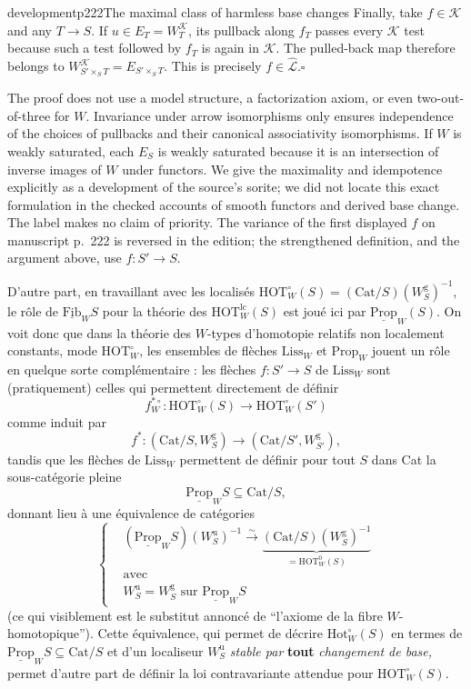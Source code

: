 \begin{dcomment}{development}{p222}{The maximal class of harmless base changes}
Finally, take $f\in\mathcal K$ and any $T\to S$. If $u\in E_T=W^{\mathcal K}_T$, its pullback along $f_T$ passes every $\mathcal K$ test because such a test followed by $f_T$ is again in $\mathcal K$. The pulled-back map therefore belongs to $W^{\mathcal K}_{S'\times_ST}=E_{S'\times_ST}$. This is precisely $f\in\widehat{\mathcal L}$.\hfill$\square$

The proof does not use a model structure, a factorization axiom, or even two-out-of-three for $W$. Invariance under arrow isomorphisms only ensures independence of the choices of pullbacks and their canonical associativity isomorphisms. If $W$ is weakly saturated, each $E_S$ is weakly saturated because it is an intersection of inverse images of $W$ under functors. We give the maximality and idempotence explicitly as a development of the source's sorite; we did not locate this exact formulation in the checked accounts of smooth functors and derived base change. The label makes no claim of priority. The variance of the first displayed $f$ on manuscript p.~222 is reversed in the edition; the strengthened definition, and the argument above, use $f:S'\to S$.
\end{dcomment}


D'autre part, en travaillant avec les localisés $\mathrm{HOT}^\circ_W(S) = (\mathrm{Cat}/S)(W^{\mathrm{g}}_S)^{-1}$, le rôle de $\underline{\mathrm{Fib}}_W S$ pour la théorie des $\mathrm{HOT}^{\mathrm{lc}}_W(S)$ est joué ici par $\underline{\mathrm{Prop}}_W(S)$. On voit donc que dans la théorie des $W$-types d'homotopie relatifs non localement constants, mode $\mathrm{HOT}^\circ_W$, les ensembles de flèches $\mathrm{Liss}_W$ et $\mathrm{Prop}_W$ jouent un rôle en quelque sorte complémentaire : les flèches $f : S' \longrightarrow S$ de $\mathrm{Liss}_W$ sont (pratiquement) celles qui permettent directement de définir
\[
f^{*\circ}_W : \mathrm{HOT}^\circ_W(S) \longrightarrow \mathrm{HOT}^\circ_W(S')
\]
comme induit par
\[
f^* : (\mathrm{Cat}/S, W^{\mathrm{g}}_S) \longrightarrow (\mathrm{Cat}/S', W^{\mathrm{g}}_{S'}),
\]
tandis que les flèches de $\mathrm{Liss}_W$ permettent de définir pour tout $S$ dans Cat la sous-catégorie pleine
\[
\underline{\mathrm{Prop}}_W S \subseteq \mathrm{Cat}/S,
\]
donnant lieu à une équivalence de catégories
\[
\left\{
\begin{aligned}
&(\underline{\mathrm{Prop}}_W S)(W^{\mathrm{u}}_S)^{-1} \xrightarrow{\sim} \underbrace{(\mathrm{Cat}/S)(W^{\mathrm{g}}_S)^{-1}}_{= \mathrm{HOT}^0_W(S)} %
\\
&\text{avec}\\
&W^{\mathrm{u}}_S = W^{\mathrm{g}}_S \text{ sur } \underline{\mathrm{Prop}}_W S
\end{aligned}
\right.
\]
(ce qui visiblement est le substitut annoncé de ``l'axiome de la fibre $W$-homotopique''). Cette
équivalence, qui permet de décrire $\mathrm{Hot}^\circ_W(S)$ en termes de $\underline{\mathrm{Prop}}_W S \subseteq \mathrm{Cat}/S$ et d'un localiseur $W^{\mathrm{u}}_S$ \textit{stable par} \textbf{tout} \textit{changement de base,} permet d'autre part de définir la loi contravariante attendue pour $\mathrm{HOT}^\circ_W(S)$.

